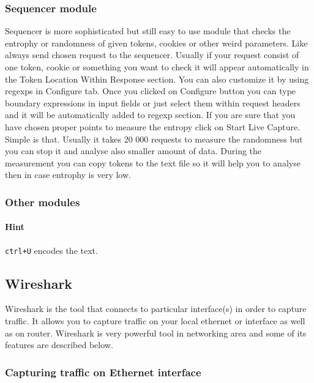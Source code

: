 \subsubsection{Sequencer module}
Sequencer is more sophisticated but still easy to use module that checks the entrophy or randomness of given tokens, cookies or other weird parameters.
Like always send chosen request to the sequencer.
Usually if your request consist of one token, cookie or something you want to check it will appear automatically in the Token Location Within Response section.
You can also customize it by using regexps in Configure tab.
Once you clicked on Configure button you can type boundary expressions in input fields or just select them within request headers and it will be automatically added to regexp section.
If you are sure that you have chosen proper points to measure the entropy click on Start Live Capture.
Simple is that.
Usually it takes 20 000 requests to measure the randomness but you can stop it and analyse also smaller amount of data.
During the measurement you can copy tokens to the text file so it will help you to analyse then in case entrophy is very low.

\subsubsection{Other modules}


\paragraph{Hint} \texttt{ctrl+U} encodes the text.

\subsection{Wireshark}
\label{subsec:wireshark}

Wireshark is the tool that connects to particular interface(s) in order to capture traffic.
It allows you to capture traffic on your local ethernet or interface as well as on router.
Wireshark is very powerful tool in networking area and some of its features are described below.

\subsubsection{Capturing traffic on Ethernet interface}

